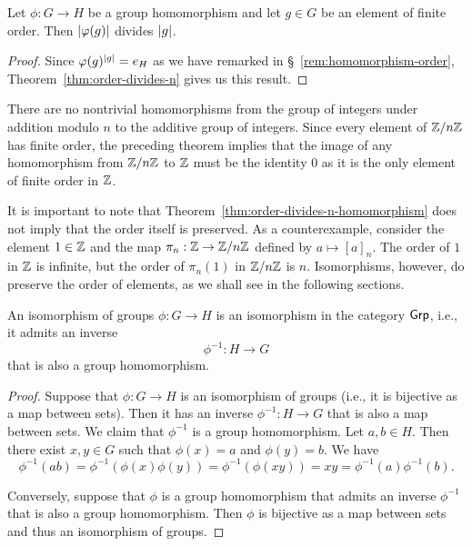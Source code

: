 \begin{theorem}
    \label{thm:order-divides-n-homomorphism}
    Let \(\phi: G \to H\) be a group homomorphism and let \(g \in G\) be an
    element of finite order. Then \(\lvert \varphi(g) \rvert\) divides \(\lvert g \rvert\).
\end{theorem}

\begin{proof}
    Since \(\varphi(g)^{\lvert g \rvert} = e_H\) as we have remarked in
    \S~\ref{rem:homomorphism-order}, Theorem~\ref{thm:order-divides-n} gives us
    this result.
\end{proof}

\begin{example}
    There are no nontrivial homomorphisms from the group of integers under
    addition modulo \(n\) to the additive group of integers. Since every element
    of \(\mathbb{Z}/n\mathbb{Z}\) has finite order, the preceding theorem implies that the image
    of any homomorphism from \(\mathbb{Z}/n\mathbb{Z}\) to \(\mathbb{Z}\) must be the identity \(0\) as
    it is the only element of finite order in \(\mathbb{Z}\).
\end{example}

\begin{example}
    It is important to note that Theorem~\ref{thm:order-divides-n-homomorphism}
    does not imply that the order itself is preserved. As a counterexample,
    consider the element \(1 \in \mathbb{Z}\) and the map \(\pi_n : \mathbb{Z} \to \mathbb{Z}/n\mathbb{Z}\)
    defined by \(a \mapsto [a]_n\). The order of \(1\) in \(\mathbb{Z}\) is infinite,
    but the order of \(\pi_n(1)\) in \(\mathbb{Z}/n\mathbb{Z}\) is \(n\). Isomorphisms, however,
    do preserve the order of elements, as we shall see in the following
    sections.
\end{example}

\begin{theorem}
    An isomorphism of groups \(\phi: G \to H\) is an isomorphism in the category
    \(\mathsf{Grp}\), i.e., it admits an inverse
    \[
        \phi^{-1}: H \to G
    \]
    that is also a group homomorphism.
\end{theorem}

\begin{proof}
    Suppose that \(\phi: G \to H\) is an isomorphism of groups (i.e., it is
    bijective as a map between sets). Then it has an inverse \(\phi^{-1}: H \to
    G\) that is also a map between sets. We claim that \(\phi^{-1}\) is a group
    homomorphism. Let \(a, b \in H\). Then there exist \(x, y \in G\) such that
    \(\phi(x) = a\) and \(\phi(y) = b\). We have
    \[
        \phi^{-1}(ab) = \phi^{-1}(\phi(x)\phi(y)) = \phi^{-1}(\phi(xy)) = xy = \phi^{-1}(a)\phi^{-1}(b).
    \]
    
    Conversely, suppose that \(\phi\) is a group homomorphism that admits an
    inverse \(\phi^{-1}\) that is also a group homomorphism. Then \(\phi\) is
    bijective as a map between sets and thus an isomorphism of groups.
\end{proof}


